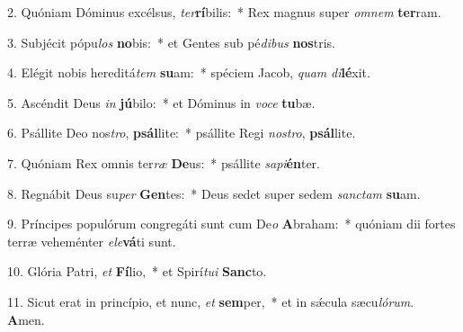 2. Quóniam Dóminus excélsus, \textit{ter}\textbf{rí}bilis:~*  Rex magnus super \textit{om}\textit{nem} \textbf{ter}ram.\

3. Subjécit pópu\textit{los} \textbf{no}bis:~*  et Gentes sub pé\textit{di}\textit{bus} \textbf{nos}tris.\

4. Elégit nobis hereditá\textit{tem} \textbf{su}am:~*  spéciem Jacob, \textit{quam} \textit{di}\textbf{lé}xit.\

5. Ascéndit Deus \textit{in} \textbf{jú}bilo:~*  et Dóminus in \textit{vo}\textit{ce} \textbf{tu}bæ.\

6. Psállite Deo nos\textit{tro}, \textbf{psál}lite:~*  psállite Regi \textit{nos}\textit{tro}, \textbf{psál}lite.\

7. Quóniam Rex omnis ter\textit{ræ} \textbf{De}us:~*  psállite \textit{sa}\textit{pi}\textbf{én}ter.\

8. Regnábit Deus su\textit{per} \textbf{Gen}tes:~*  Deus sedet super sedem \textit{sanc}\textit{tam} \textbf{su}am.\

9. Príncipes populórum congregáti sunt cum De\textit{o} \textbf{A}braham:~*  quóniam dii fortes terræ veheménter \textit{e}\textit{le}\textbf{vá}ti sunt.\

10. Glória Patri, \textit{et} \textbf{Fí}lio,~*  et Spirí\textit{tu}\textit{i} \textbf{Sanc}to.\

11. Sicut erat in princípio, et nunc, \textit{et} \textbf{sem}per,~*  et in sǽcula sæcu\textit{ló}\textit{rum}. \textbf{A}men.\

